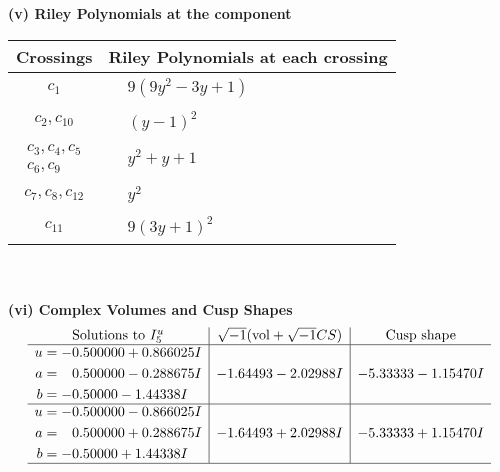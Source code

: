 \documentclass[1p]{elsarticle_modified}
\theoremstyle{definition}
\newcommand{\I}{\sqrt{-1}}
\begin{document}
\newpage\renewcommand{\arraystretch}{1}
\flushleft \textbf{(v) Riley Polynomials at the component}\newline \\
\begin{tabular}{m{50pt}|m{274pt}}
Crossings & \hspace{64pt}Riley Polynomials at each crossing \\
\hline $$\begin{aligned}c_{1}\end{aligned}$$&$\begin{aligned}
&9(9 y^2-3 y+1)
\end{aligned}$\\
\hline $$\begin{aligned}c_{2},c_{10}\end{aligned}$$&$\begin{aligned}
&(y-1)^2
\end{aligned}$\\
\hline $$\begin{aligned}c_{3},c_{4},c_{5}\\c_{6},c_{9}\end{aligned}$$&$\begin{aligned}
&y^2+y+1
\end{aligned}$\\
\hline $$\begin{aligned}c_{7},c_{8},c_{12}\end{aligned}$$&$\begin{aligned}
&y^2
\end{aligned}$\\
\hline $$\begin{aligned}c_{11}\end{aligned}$$&$\begin{aligned}
&9(3 y+1)^2
\end{aligned}$\\
\hline
\end{tabular}\\~\\
\newpage\flushleft \textbf{(vi) Complex Volumes and Cusp Shapes}
$$\begin{array}{c|c|c}  
\text{Solutions to }I^u_{5}& \I (\text{vol} + \sqrt{-1}CS) & \text{Cusp shape}\\
 \hline 
\begin{aligned}
u &= -0.500000 + 0.866025 I \\
a &= \phantom{-}0.500000 - 0.288675 I \\
b &= -0.50000 - 1.44338 I\end{aligned}
 & -1.64493 - 2.02988 I & -5.33333 - 1.15470 I \\ \hline\begin{aligned}
u &= -0.500000 - 0.866025 I \\
a &= \phantom{-}0.500000 + 0.288675 I \\
b &= -0.50000 + 1.44338 I\end{aligned}
 & -1.64493 + 2.02988 I & -5.33333 + 1.15470 I\\
 \hline 
 \end{array}$$\newpage\newpage\renewcommand{\arraystretch}{1}
\end{document}
